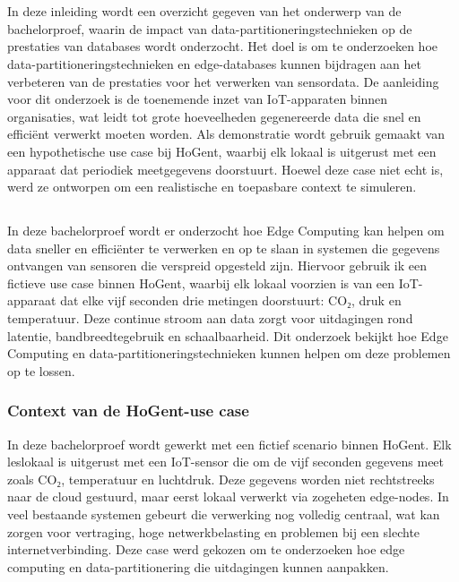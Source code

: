 
\chapter{}%
\label{ch:inleiding}

In deze inleiding wordt een overzicht gegeven van het onderwerp van de bachelorproef, waarin de impact van data-partitioneringstechnieken op de prestaties van databases wordt onderzocht. 
Het doel is om te onderzoeken hoe data-partitioneringstechnieken en edge-databases kunnen bijdragen aan het verbeteren van de prestaties voor het verwerken van sensordata.
De aanleiding voor dit onderzoek is de toenemende inzet van IoT-apparaten binnen organisaties, wat leidt tot grote hoeveelheden gegenereerde data die snel en efficiënt verwerkt moeten worden. 
Als demonstratie wordt gebruik gemaakt van een hypothetische use case bij HoGent, waarbij elk lokaal is uitgerust met een apparaat dat periodiek meetgegevens doorstuurt. 
Hoewel deze case niet echt is, werd ze ontworpen om een realistische en toepasbare context te simuleren.
\section{}%
\label{sec:probleemstelling}

In deze bachelorproef wordt er onderzocht hoe Edge Computing kan helpen om data sneller en efficiënter te verwerken en op te slaan in  systemen die gegevens ontvangen van sensoren die verspreid opgesteld zijn. 
Hiervoor gebruik ik een fictieve use case binnen HoGent, waarbij elk lokaal voorzien is van een IoT-apparaat dat elke vijf seconden drie metingen doorstuurt: CO₂, druk en temperatuur.
Deze continue stroom aan data zorgt voor uitdagingen rond latentie, bandbreedtegebruik en schaalbaarheid. 
Dit onderzoek bekijkt hoe Edge Computing en data-partitioneringstechnieken kunnen helpen om deze problemen op te lossen.

\subsection*{Context van de HoGent-use case}
In deze bachelorproef wordt gewerkt met een fictief scenario binnen HoGent. Elk leslokaal is uitgerust met een IoT-sensor die om de vijf seconden gegevens meet zoals CO₂, temperatuur en luchtdruk. Deze gegevens worden niet rechtstreeks naar de cloud gestuurd, maar eerst lokaal verwerkt via zogeheten edge-nodes. In veel bestaande systemen gebeurt die verwerking nog volledig centraal, wat kan zorgen voor vertraging, hoge netwerkbelasting en problemen bij een slechte internetverbinding. Deze case werd gekozen om te onderzoeken hoe edge computing en data-partitionering die uitdagingen kunnen aanpakken.

